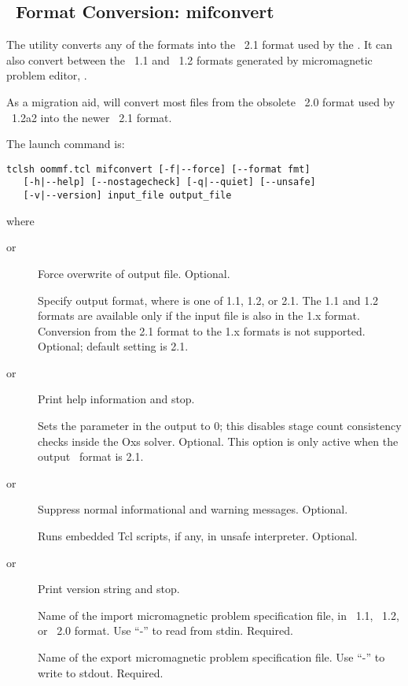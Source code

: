 \subsection{\MIF\ Format Conversion: mifconvert}\label{sec:mifconvert}%

The  utility converts any
of the
 formats into the 
\MIF~2.1 format used by the
.
It can also convert between
the  \MIF~1.1 and \MIF~1.2
formats generated by micromagnetic problem editor,
.

As a migration aid,  will convert most files from the
obsolete \MIF~2.0 format used by \OOMMF\ 1.2a2 into the newer
\MIF~2.1 format.

The  launch command is:
\begin{verbatim}
tclsh oommf.tcl mifconvert [-f|--force] [--format fmt]
   [-h|--help] [--nostagecheck] [-q|--quiet] [--unsafe]
   [-v|--version] input_file output_file
\end{verbatim}
where
\begin{description}
\item[ or ]
  Force overwrite of output file.  Optional.
\item[]
  Specify output format, where  is one of 1.1, 1.2, or 2.1.  The
  1.1 and 1.2 formats are available only if the input file is also in
  the 1.x format.  Conversion from the 2.1 format to the 1.x formats is
  not supported.  Optional; default setting is 2.1.
\item[ or ]
  Print help information and stop.
\item[]
  Sets the  parameter in the output
  to 0;
 this disables stage count consistency checks inside the Oxs
 solver. Optional.
 This option is only active when the output \MIF\ format is 2.1.
\item[ or ]
  Suppress normal informational and warning messages.  Optional.
\item[]
  Runs embedded Tcl scripts, if any, in unsafe interpreter.  Optional.
\item[ or ]
  Print version string and stop.
\item[]
  Name of the import micromagnetic problem specification file, in
  \MIF~1.1, \MIF~1.2, or \MIF~2.0 format.  Use ``-'' to read from stdin.
  Required.
\item[]
  Name of the export micromagnetic problem specification file. Use ``-''
  to write to stdout.  Required.
\end{description}


